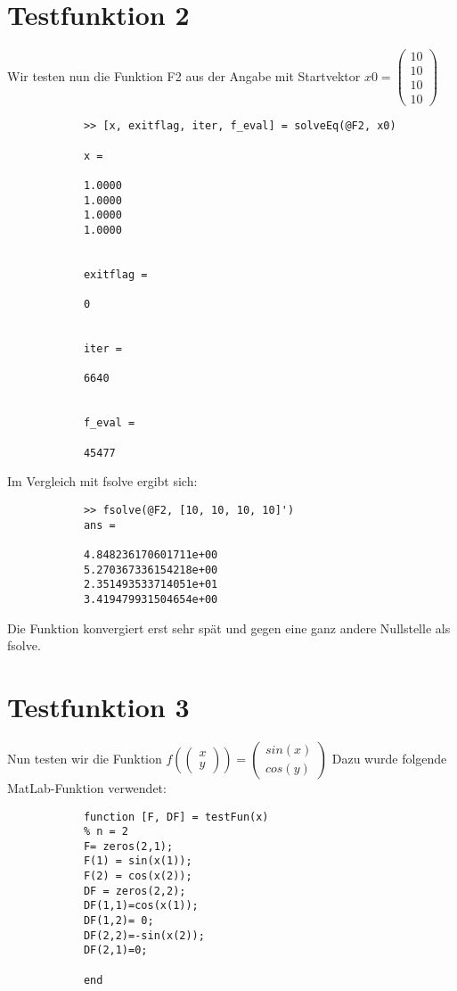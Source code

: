 \documentclass[11pt,titlepage]{article}
\begin{document}
	\section{Testfunktion 2}
		Wir testen nun die Funktion F2 aus der Angabe mit Startvektor $ x0 = \begin{pmatrix} 10 \\ 10 \\ 10 \\10 \end{pmatrix} $
		
		\begin{lstlisting}
			>> [x, exitflag, iter, f_eval] = solveEq(@F2, x0)
			
			x =
			
			1.0000
			1.0000
			1.0000
			1.0000
			
			
			exitflag =
			
			0
			
			
			iter =
			
			6640
			
			
			f_eval =
			
			45477
		\end{lstlisting}
		
		Im Vergleich mit fsolve ergibt sich:
		
		\begin{lstlisting}
			>> fsolve(@F2, [10, 10, 10, 10]')
			ans =
			
			4.848236170601711e+00
			5.270367336154218e+00
			2.351493533714051e+01
			3.419479931504654e+00	
		\end{lstlisting}
		
		Die Funktion konvergiert erst sehr spät und gegen eine ganz andere Nullstelle als fsolve.
		
	\section{Testfunktion 3}
		Nun testen wir die Funktion $ f(\begin{pmatrix} x \\ y \end{pmatrix}) = \begin{pmatrix} sin(x) \\ cos(y) \end{pmatrix}$
		Dazu wurde folgende MatLab-Funktion verwendet:
		\begin{lstlisting}
			function [F, DF] = testFun(x)
			% n = 2    
			F= zeros(2,1);
			F(1) = sin(x(1));
			F(2) = cos(x(2));
			DF = zeros(2,2);
			DF(1,1)=cos(x(1));
			DF(1,2)= 0;
			DF(2,2)=-sin(x(2));
			DF(2,1)=0;    
			
			end
		\end{lstlisting}
		
\end{document}
